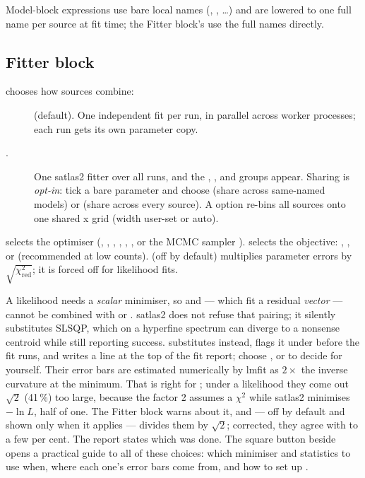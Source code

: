 Model-block expressions use bare local names (,
, \dots) and are lowered to one full
 name per source at fit
time; the Fitter block's  use the full
names directly.

\subsection{Fitter block}

 chooses how sources combine:

\begin{description}
    \item[] (default). One independent fit
        per run, in parallel across worker processes; each run gets
        its own parameter copy.
    \item[.] One satlas2 fitter over all runs, and
        the , , and
         groups appear. Sharing is \emph{opt-in}:
        tick a bare parameter and choose  (share across
        same-named models) or  (share across every source).
        A  option re-bins all sources onto one
        shared x grid (width user-set or auto).
\end{description}

 selects the optimiser (,
, , , ,
, or the MCMC sampler ). 
selects the objective: , , or
 (recommended at low counts).  (off by default) multiplies parameter errors by
$\sqrt{\chi^2_{\mathrm{red}}}$; it is forced off for likelihood
fits.

A likelihood needs a \emph{scalar} minimiser, so  and
 --- which fit a residual \emph{vector} --- cannot
be combined with  or . satlas2 does
not refuse that pairing; it silently substitutes SLSQP, which on a
hyperfine spectrum can diverge to a nonsense centroid while still
reporting success. \denis{} substitutes  instead, flags it
under  before the fit runs, and writes a
\code{[Minimiser]} line at the top of the fit report; choose
,  or  to decide for yourself.
Their error bars are estimated numerically by lmfit as $2\times$
the inverse curvature at the minimum. That is right for
; under a likelihood they come out $\sqrt{2}$ (41\,\%)
too large, because the factor 2 assumes a $\chi^2$ while satlas2
minimises $-\ln L$, half of one. The Fitter block warns about it, and
 --- off by default and shown only
when it applies --- divides them by $\sqrt{2}$; corrected, they agree
with  to a few per cent. The report states which was
done. The square
 button beside  opens a practical guide to all of
these choices: which minimiser and statistics to use when, where each
one's error bars come from, and how to set up .

